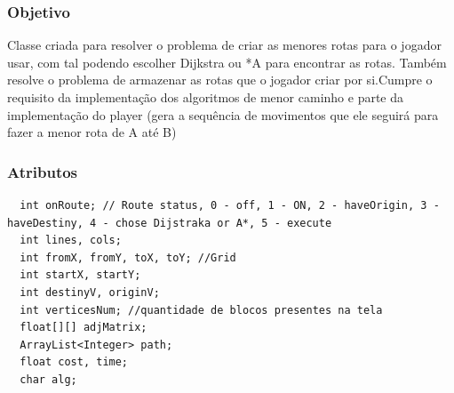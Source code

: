 \documentclass[
	12pt,				%
	oneside,			%
	a4paper,			%
	english,			%
	brazil,				%
	]{abntex2}
\begin{document}
{\subsubsection{Objetivo}

Classe criada para resolver o problema de criar as menores rotas para o jogador usar, com tal podendo escolher Dijkstra ou *A para encontrar as rotas. Também resolve o problema de armazenar as rotas que o jogador criar por si.Cumpre o requisito da implementação dos algoritmos de menor caminho e parte da implementação do player (gera a sequência de movimentos que ele seguirá para fazer a menor rota de A até B)

\subsubsection{Atributos}
\begin{lstlisting}
  int onRoute; // Route status, 0 - off, 1 - ON, 2 - haveOrigin, 3 - haveDestiny, 4 - chose Dijstraka or A*, 5 - execute
  int lines, cols;
  int fromX, fromY, toX, toY; //Grid
  int startX, startY;
  int destinyV, originV;
  int verticesNum; //quantidade de blocos presentes na tela
  float[][] adjMatrix;
  ArrayList<Integer> path;
  float cost, time;
  char alg;
\end{lstlisting}

}
\end{document}
